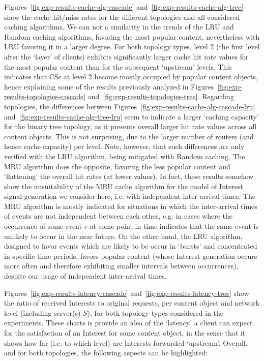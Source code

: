Figures~\ref{fig:exp-results-cache-alg-cascade} and~\ref{fig:exp-results-cache-alg-tree} 
show the cache hit\slash miss rates for the different topologies and all considered 
caching algorithms. We can not a similarity in the trends of the LRU and Random caching 
algorithms, favoring the most popular content, nevertheless with LRU favoring it 
in a larger degree. For both topology types, level 2 (the first level after the 
`layer' of clients) exhibits significantly larger cache hit rate values for the most 
popular content than for the subsequent `upstream' levels. This indicates 
that CSs at level 2 become mostly occupied by popular content objects, hence explaining 
some of the results previously analyzed in Figures~\ref{fig:exp-results-topologies-cascade} 
and~\ref{fig:exp-results-topologies-tree}. Regarding topologies, 
the differences between Figures~\ref{fig:exp-results-cache-alg-cascade-lru} 
and~\ref{fig:exp-results-cache-alg-tree-lru} seem to indicate a larger `caching 
capacity' for the binary tree topology, as it presents overall larger hit rate 
values across all content objects. This is not surprising, due to the 
larger number of routers (and hence cache capacity) per level. Note, however, 
that such differences are 
only verified with the LRU algorithm, being mitigated with Random caching. The 
MRU algorithm does the opposite, 
favoring the less popular content and `flattening' the overall hit rates (at lower 
values). In fact, these results somehow show the unsuitability of the MRU cache 
algorithm for the model of Interest signal generation we consider here, i.e. with 
independent inter-arrival times. The MRU algorithm is mostly indicated for 
situations in which the inter-arrival times of events are not independent between 
each other, e.g. in cases where the occurrence of some event $e$ at some point 
in time indicates that the same event is unlikely to occur in the near future. On the 
other hand, the LRU algorithm, designed to favor events which are likely to be occur 
in `bursts' and concentrated in specific time periods, favors popular content (whose Interest 
generation occurs more often and therefore exhibiting smaller intervals between occurrences), 
despite our usage of independent inter-arrival times.\shortvertbreak

Figures~\ref{fig:exp-results-latency-cascade} and~\ref{fig:exp-results-latency-tree} show 
the ratio of received Interests to original requests, per content object 
and network level (including server(s) $S$), for both topology types considered in the 
experiments. These charts is provide an idea of the `latency' a client can expect for 
the satisfaction of an Interest for some content object, in the sense that it shows how far (i.e. to 
which level) are Interests forwarded `upstream'. Overall, and for both topologies, 
the following aspects can be highlighted: 

